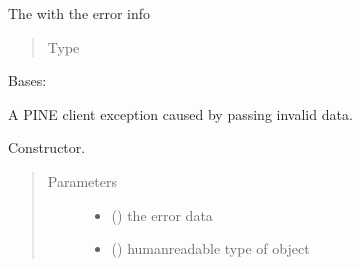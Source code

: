\documentclass[letterpaper,10pt,english]{sphinxmanual}
\begin{document}
\begin{fulllineitems}
\begin{fulllineitems}
\label{\detokenize{autoapi/pine/client/exceptions/index:pine.client.exceptions.PineClientHttpException.resp}}
The  with the error info
\begin{quote}\begin{description}
\item[{Type}] \leavevmode
{}

\end{description}\end{quote}

\end{fulllineitems}


\end{fulllineitems}


\begin{fulllineitems}
\label{\detokenize{autoapi/pine/client/exceptions/index:pine.client.exceptions.PineClientValueException}}
Bases: {\hyperref[\detokenize{autoapi/pine/client/exceptions/index:pine.client.exceptions.PineClientException}]{}}

A PINE client exception caused by passing invalid data.

Constructor.
\begin{quote}\begin{description}
\item[{Parameters}] \leavevmode\begin{itemize}
\item {} 
 () \textendash{} the error data

\item {} 
 () \textendash{} human\sphinxhyphen{}readable type of object

\end{itemize}

\end{description}\end{quote}

\end{fulllineitems}
\end{document}
